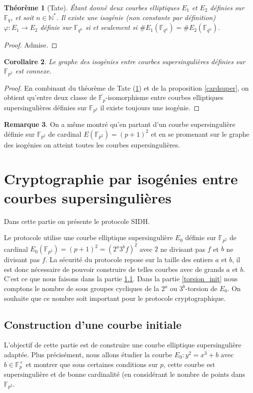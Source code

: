 \documentclass{article}
\theoremstyle{plain}%
\newtheorem{thm}{Théorème}[section]
\newtheorem{cor}[thm]{Corollaire}
\theoremstyle{definition}%
\newtheorem{rem}[thm]{Remarque}
\newcommand{\F}{\mathbb{F}}
\newcommand{\N}{\mathbb{N}}
\begin{document}
\begin{thm}[Tate]
  \label{tate}
Étant donné deux courbes elliptiques $E_1$ et $E_2$ définies sur $\F_{q}$, et soit $n\in\N^*$. Il existe une isogénie (non constante par définition) $\varphi : E_1 \to E_2$ définie sur $\F_{q^n}$ si et seulement si $\# E_1(\F_{q^n}) = \# E_2(\F_{q^n})$. 
\end{thm}

\begin{proof}
  Admise.
\end{proof}


\begin{cor}
  Le graphe des isogénies entre courbes supersingulières définies sur $\F_{p^2}$ est connexe.
\end{cor}

\begin{proof}
  En combinant du théorème de Tate (\ref{tate}) et de la proposition \ref{cardsuper}, on obtient qu'entre deux classe de $\overline{\F_p}$-isomorphisme entre courbes elliptiques supersingulières définies sur $\F_{p^2}$ il existe toujours une isogénie.
\end{proof}

\begin{rem}
  On a même montré qu'en partant d'un courbe supersingulière définie sur $\F_{p^2}$ de cardinal $E(\F_{p^2}) = (p+1)^2$ et en se promenant sur le graphe des isogénies on atteint toutes les courbes supersingulières.
\end{rem}

\section{Cryptographie par isogénies entre courbes supersingulières}

Dans cette partie on présente le protocole SIDH. 

Le protocole utilise une courbe elliptique supersingulière $E_0$ définie sur $\F_{p^2}$ de cardinal $E_0(\F_{p^2}) = (p+1)^2 =(2^a3^bf)^2$ avec $2$ ne divisant pas $f$ et $b$ ne divisant pas $f$. La sécurité du protocole repose sur la taille des entiers $a$ et $b$, il est donc nécessaire de pouvoir construire de telles courbes avec de grands $a$ et $b$. C'est ce que nous faisons dans la partie \ref{init}. Dans la partie \ref{torsion_init} nous comptons le nombre de sous groupes cycliques de la $2^a$ ou $3^b$-torsion de $E_0$. On souhaite que ce nombre soit important pour le protocole cryptographique.

\subsection{Construction d'une courbe initiale}
\label{init}
L'objectif de cette partie est de construire une courbe elliptique supersingulière adaptée.
Plus précisément, nous allons étudier la courbe $E_0 : y^2 = x^3 + b$ avec $b\in\F_{p}^\times$ et montrer que sous certaines conditions sur $p$, cette courbe est supersingulière et de bonne cardinalité (en considérant le nombre de points dans $\F_{p^2}$.
\end{document}
